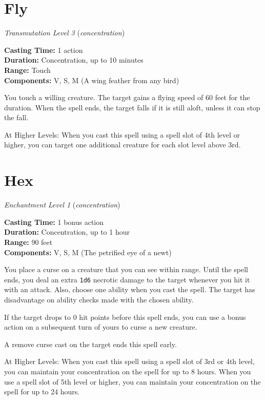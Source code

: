 \documentclass[twocolumn,lettersize]{article}
\begin{document}
  
    {
  

  \section*{Fly}

    \textit{Transmutation Level 3} %
    (\textit{concentration})%
             
  \noindent
  \textbf{Casting Time:} 1 action \\
  \textbf{Duration:} Concentration, up to 10 minutes\\
  \textbf{Range:} Touch \\
  \textbf{Components:} V, S, M (A wing feather from any bird) 

  You touch a willing creature. The target gains a flying speed of 60 feet for the
     duration. When the spell ends, the target falls if it is still aloft, unless it
     can stop the fall.
    
    At Higher Levels: When you cast this spell using a spell 
    slot of 4th level or higher, you can target one additional creature for each 
    slot level above 3rd.
    

  } %

  
    {
  

  \section*{Hex}

    \textit{Enchantment Level 1} %
    (\textit{concentration})%
             
  \noindent
  \textbf{Casting Time:} 1 bonus action \\
  \textbf{Duration:} Concentration, up to 1 hour\\
  \textbf{Range:} 90 feet \\
  \textbf{Components:} V, S, M (The petrified eye of a newt) 

  You place a curse on a creature that you can see within range. Until the spell 
    ends, you deal an extra \texttt{1d6} necrotic damage to the target whenever you hit it 
    with an attack. Also, choose one ability when you cast the spell. The target has
     disadvantage on ability checks made with the chosen ability.
    
    If the target 
    drops to 0 hit points before this spell ends, you can use a bonus action on a 
    subsequent turn of yours to curse a new creature.
    
    A remove curse cast on the 
    target ends this spell early.
    
    At Higher Levels: When you cast this spell using 
    a spell slot of 3rd or 4th level, you can maintain your concentration on the 
    spell for up to 8 hours.
    When you use a spell slot of 5th level or higher, you 
    can maintain your concentration on the spell for up to 24 hours.
    

  } %
\end{document}
